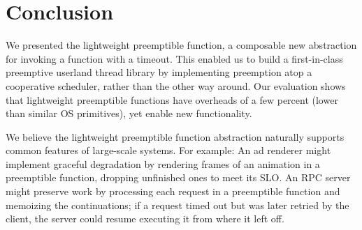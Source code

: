 \section{Conclusion}

We presented the lightweight preemptible function, a composable new abstraction
for invoking a function with a timeout.  This enabled us to build a first-in-class
preemptive userland thread library by implementing preemption atop a cooperative
scheduler, rather than the other way around.  Our evaluation shows that lightweight
preemptible functions have overheads of a few percent (lower than similar OS
primitives), yet enable new functionality.

We believe the lightweight preemptible function abstraction naturally supports
common features of large-scale systems.  For example:  An ad renderer might implement
graceful degradation by rendering frames of an animation in a preemptible function,
dropping unfinished ones to meet its SLO.  An RPC server might preserve work by
processing each request in a preemptible function and memoizing the continuations; if
a request timed out but was later retried by the client, the server could resume
executing it from where it left off.
